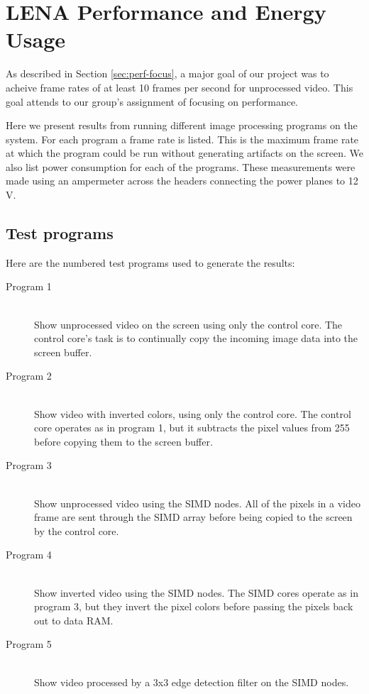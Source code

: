 \section{LENA Performance and Energy Usage}

As described in Section \ref{sec:perf-focus}, a major goal of our
project was to acheive frame rates of at least 10 frames per second for
unprocessed video. This goal attends to our group's assignment of
focusing on performance.

Here we present results from running different image processing programs
on the system. For each program a frame rate is listed. This is the
maximum frame rate at which the program could be run without generating
artifacts on the screen. We also list power consumption for
each of the programs. These measurements were made using an ampermeter
across the headers connecting the power planes to 12 V.

\subsection{Test programs}

Here are the numbered test programs used to generate the results:

\begin{description}
    \item[Program 1] \hfill \\
        Show unprocessed video on the screen using only the control
        core. The control core's task is to continually copy the
        incoming image data into the screen buffer.
    \item[Program 2] \hfill \\
        Show video with inverted colors, using only the control core.
        The control core operates as in program 1, but it subtracts the
        pixel values from 255 before copying them to the screen buffer.
    \item[Program 3] \hfill \\
        Show unprocessed video using the SIMD nodes. All of the pixels
        in a video frame are sent through the SIMD array before being
        copied to the screen by the control core.
    \item[Program 4] \hfill \\
        Show inverted video using the SIMD nodes. The SIMD cores operate
        as in program 3, but they invert the pixel colors before passing
        the pixels back out to data RAM.
    \item[Program 5] \hfill \\
        Show video processed by a 3x3 edge detection filter on the SIMD
        nodes.
\end{description}

